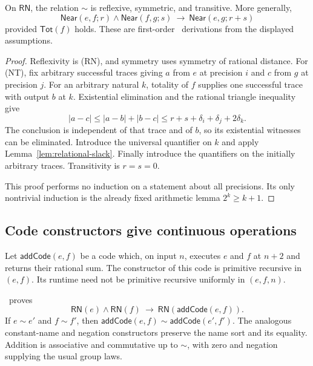 \begin{theorem}
\label{thm:relational-setoid}
On $\mathsf{RN}$, the relation $\sim$ is reflexive, symmetric, and transitive.
More generally,
\[
 \mathsf{Near}(e,f;r)\wedge\mathsf{Near}(f,g;s)
       \ \longrightarrow\ \mathsf{Near}(e,g;r+s)
 \tag{NT}
\]
provided $\mathsf{Tot}(f)$ holds. These are first-order \ipra\ derivations
from the displayed assumptions.
\end{theorem}

\begin{proof}
Reflexivity is (RN), and symmetry uses symmetry of rational distance. For
(NT), fix arbitrary successful traces giving $a$ from $e$ at precision $i$
and $c$ from $g$ at precision $j$. For an arbitrary natural $k$, totality of
$f$ supplies one successful trace with output $b$ at $k$. Existential
elimination and the rational triangle inequality give
\[
 |a-c|\leq |a-b|+|b-c|
       \leq r+s+\delta_i+\delta_j+2\delta_k.
\]
The conclusion is independent of that trace and of $b$, so its existential
witnesses can be eliminated. Introduce the universal quantifier on $k$ and
apply Lemma~\ref{lem:relational-slack}. Finally introduce the quantifiers on
the initially arbitrary traces. Transitivity is $r=s=0$.

This proof performs no induction on a statement about all precisions. Its
only nontrivial induction is the already fixed arithmetic lemma
$2^k\geq k+1$.
\end{proof}

\subsection{Code constructors give continuous operations}

Let $\mathsf{addCode}(e,f)$ be a code which, on input $n$, executes $e$ and
$f$ at $n+2$ and returns their rational sum. The constructor of this code is
primitive recursive in $(e,f)$. Its runtime need not be primitive recursive
uniformly in $(e,f,n)$.

\begin{theorem}
\label{thm:relational-addition}
\ipra\ proves
\[
 \mathsf{RN}(e)\wedge\mathsf{RN}(f)
    \ \longrightarrow\ \mathsf{RN}(\mathsf{addCode}(e,f)).
 \tag{A1}
\]
If $e\sim e'$ and $f\sim f'$, then
$\mathsf{addCode}(e,f)\sim\mathsf{addCode}(e',f')$.
The analogous constant-name and negation constructors preserve the name
sort and its equality. Addition is associative and commutative up to $\sim$,
with zero and negation supplying the usual group laws.
\end{theorem}

